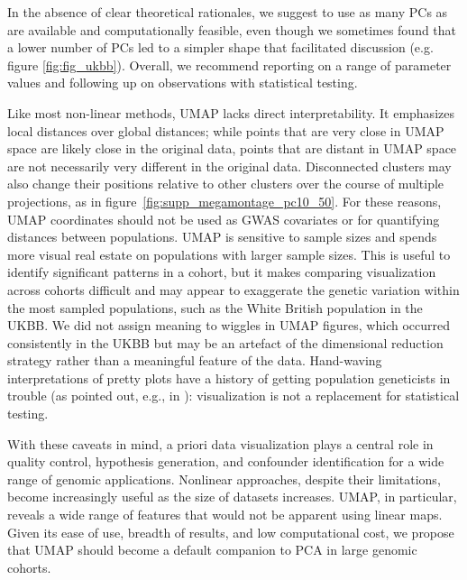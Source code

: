\documentclass[12pt]{pnas-new}
\begin{document}
In the absence of clear theoretical rationales, we suggest to use as many PCs as are available and computationally feasible, even though we sometimes found that a lower number of PCs led to a simpler shape that facilitated discussion (e.g. figure \ref{fig:fig_ukbb}). Overall, we recommend reporting on a range of parameter values and following up on observations with statistical testing. 

Like most non-linear methods, UMAP lacks direct interpretability. It emphasizes local distances over global distances; while points that are very close in UMAP space are likely close in the original data, points that are distant in UMAP space are not necessarily very different in the original data. Disconnected clusters may also change their positions relative to other clusters over the course of multiple projections, as in figure~\ref{fig:supp_megamontage_pc10_50}. For these reasons, UMAP coordinates should not be used as GWAS covariates or for quantifying distances between populations. UMAP is sensitive to sample sizes and spends more visual real estate on populations with larger sample sizes. This is useful to identify significant patterns in a cohort, but it makes comparing visualization across cohorts difficult and may appear to exaggerate the genetic variation within the most sampled populations, such as the White British population in the UKBB. We did not assign meaning to wiggles in UMAP figures, which occurred consistently in the UKBB but may be an artefact of the dimensional reduction strategy rather than a meaningful feature of the data. Hand-waving interpretations of pretty plots have a history of getting population geneticists in trouble (as pointed out, e.g., in \cite{novembre2008interpreting}): visualization is not a replacement for statistical testing.

With these caveats in mind, a priori data visualization plays a central role in quality control, hypothesis generation, and confounder identification for a wide range of genomic applications. Nonlinear approaches, despite their limitations, become increasingly useful as the size of datasets increases. UMAP, in particular, reveals a wide range of features that would not be apparent using linear maps. Given its ease of use, breadth of results, and low computational cost, we propose that UMAP should become a default companion to PCA in large genomic cohorts.
\end{document}

